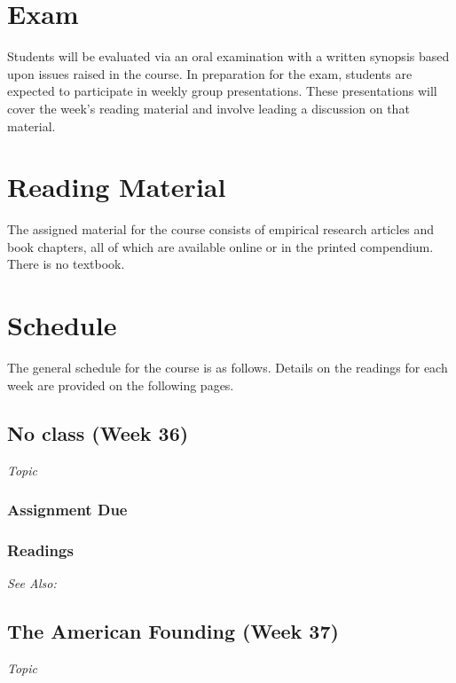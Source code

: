 \documentclass[12pt,a4paper]{article}
\newcommand{\seealso}{\noindent \emph{See Also:}\\}
\begin{document}
\section{Exam}
Students will be evaluated via an oral examination with a written synopsis based upon issues raised in the course. In preparation for the exam, students are expected to participate in weekly group presentations. These presentations will cover the week's reading material and involve leading a discussion on that material.

\section{Reading Material}
The assigned material for the course consists of empirical research articles and book chapters, all of which are available online or in the printed compendium. There is no textbook.

\section{Schedule}
The general schedule for the course is as follows. Details on the readings for each week are provided on the following pages.

\secttoc


\clearpage


\subsection{No class (Week 36)}
\emph{Topic}
\vspace{1em}

\subsubsection*{Assignment Due}

\subsubsection*{Readings}

\seealso




\clearpage
\subsection{The American Founding (Week 37)}
\emph{Topic}

\vspace{1em}
\end{document}
